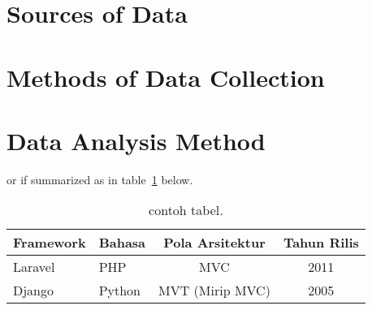 	\section{Sources of Data}
	\lipsum[3]
	\section{Methods of Data Collection}
	\lipsum[3]
	\section{Data Analysis Method}	
	\lipsum[3]
	or if summarized as in table~\ref{tab:contoh-t} below.
	
	\begin{table}[h!]
		\centering
		\caption{contoh tabel.}
		\label{tab:contoh-t}
		\begin{tabular}{llcc}
			\toprule
			\textbf{Framework} & \textbf{Bahasa} & \textbf{Pola Arsitektur} & \textbf{Tahun Rilis} \\
			\midrule
			Laravel & PHP & MVC & 2011 \\
			Django & Python & MVT (Mirip MVC) & 2005 \\
			\bottomrule
		\end{tabular}
	\end{table}